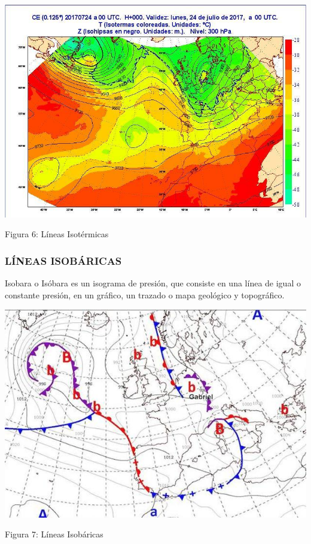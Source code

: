 \documentclass[12pt,letterpaper]{article}
\begin{document}
\begin{titlepage}

\centering
\includegraphics[scale=0.5]{Figura isotermicas}

Figura 6: Líneas Isotérmicas

\begin{flushleft}

\subsubsection{LÍNEAS ISOBÁRICAS}
Isobara o Isóbara es un isograma de presión, que consiste en una línea de igual o constante presión, en un gráfico, un trazado o mapa geológico y topográfico.
\end{flushleft}
\vspace{1cm}

\centering
\includegraphics[scale=0.5]{Lineas isobaricas}

Figura 7: Líneas Isobáricas

\end{titlepage}
\end{document}
